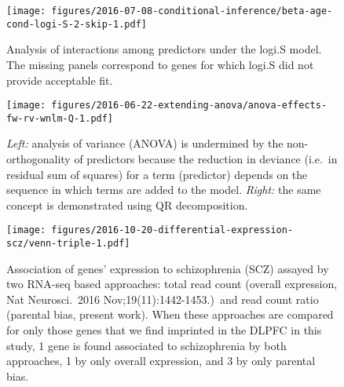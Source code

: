\documentclass[letterpaper]{article}
\begin{document}
\begin{figure}
\begin{center}
\texttt{[image: figures/2016-07-08-conditional-inference/beta-age-cond-logi-S-2-skip-1.pdf]}
\end{center}
\caption{
Analysis of interactions among predictors under the logi.S model.  The missing
panels correspond to genes for which logi.S did not provide acceptable fit.
}
\label{fig:interaction-logi.S}
\end{figure}

\begin{figure}
\begin{center}
\texttt{[image: figures/2016-06-22-extending-anova/anova-effects-fw-rv-wnlm-Q-1.pdf]}
\end{center}
\caption{
\emph{Left:} analysis of variance (ANOVA) is undermined by the non-orthogonality of
predictors because the reduction in deviance (i.e.~in residual sum of squares)
for a term (predictor) depends on the sequence in which terms are added to the
model.  \emph{Right:} the same concept is demonstrated using QR decomposition.
}
\label{fig:anova}
\end{figure}

\begin{figure}
\begin{center}
\texttt{[image: figures/2016-10-20-differential-expression-scz/venn-triple-1.pdf]}
\end{center}
\caption{
Association of genes' expression to schizophrenia (SCZ) assayed by two RNA-seq
based approaches: total read count (overall expression, Nat Neurosci.~2016
Nov;19(11):1442-1453.)~and read count ratio
(parental bias, present work).  When these approaches are compared for only
those genes that we find imprinted in the DLPFC in this study, 1 gene is found
associated to schizophrenia by both approaches, 1 by only overall expression,
and 3 by only parental bias.
}
\label{fig:diff-exp-scz}
\end{figure}



\setcounter{table}{0}
\makeatletter 
\renewcommand{\thetable}{S\@arabic\c@table}
\makeatother
\end{document}
